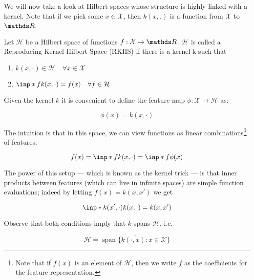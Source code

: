 


We will now take a look at Hilbert spaces whose structure is highly linked with a kernel. 
Note that if we pick some $x \in \mathcal{X}$, then $k(x, .)$ is a function from $\mathcal{X}$ to $\R$.

\begin{definition}
    Let $\mathcal{H}$ be a Hilbert space of functions $f: \mathcal{X} \rightarrow \R$. 
    $\mathcal{H}$ is called a Reproducing Kernel Hilbert Space (RKHS) if there is a kernel k such that

    \begin{enumerate}
        \item $ k(x, \cdot) \in \mathcal{H} \quad \forall x \in \mathcal{X}$
        \item $ \inp*{f}{k(x, \cdot)} = f(x) \quad \forall f \in \mathcal{H}$
    \end{enumerate}

\end{definition}

Given the kernel $k$ it is convenient to define the feature map $\phi: \mathcal{X} \rightarrow \mathcal{H}$ as:

$$
    \phi(x) = k(x, \cdot)
$$

The intuition is that in this space, we can view functions as linear combinations\footnote{
    Note that if $f(x)$ is an element of $\mathcal{H}$, then we write $f$ as the coefficients
    for the feature representation. 
} of features:

$$
    f(x) =  \inp*{f}{k(x, \cdot)} = \inp*{f}{\phi(x)}
$$


The power of this setup --- which is known as the kernel trick --- is that inner products between
features (which can live in infinite spaces) are simple function evaluations; 
indeed by letting $f(x) = k(x, x\prime)$ we get

$$
    \inp*{k(x^\prime, \cdot)}{k(x, \cdot)} = k(x, x^\prime)
$$

Observe that both conditions imply that $k$ spans $\mathcal{H}$, i.e.

\begin{equation}
    \mathcal{H}=\overline{\operatorname{span}\{k(\cdot, x): x \in \mathcal{X}\}}
\end{equation}

